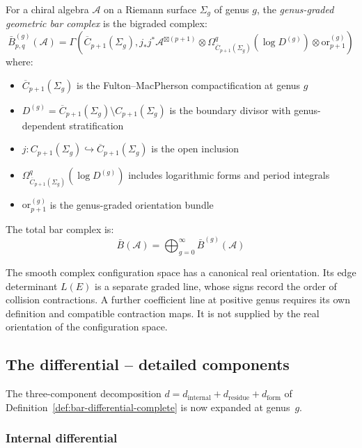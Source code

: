 \begin{definition}\label{def:geom-bar}
For a chiral algebra $\mathcal{A}$ on a Riemann surface $\Sigma_g$ of genus $g$, the \emph{genus-graded geometric bar complex} is the bigraded complex:
\[
\bar{B}^{(g)}_{p,q}(\mathcal{A}) = \Gamma\left(\overline{C}_{p+1}(\Sigma_g), j_*j^*\mathcal{A}^{\boxtimes(p+1)} \otimes \Omega^q_{\overline{C}_{p+1}(\Sigma_g)}(\log D^{(g)}) \otimes \text{or}_{p+1}^{(g)}\right)
\]
where:
\begin{itemize}
\item $\overline{C}_{p+1}(\Sigma_g)$ is the Fulton--MacPherson compactification at genus $g$
\item $D^{(g)} = \overline{C}_{p+1}(\Sigma_g) \setminus C_{p+1}(\Sigma_g)$ is the boundary divisor with genus-dependent stratification
\item $j: C_{p+1}(\Sigma_g) \hookrightarrow \overline{C}_{p+1}(\Sigma_g)$ is the open inclusion
\item $\Omega^q_{\overline{C}_{p+1}(\Sigma_g)}(\log D^{(g)})$ includes logarithmic forms and period integrals
\item $\text{or}_{p+1}^{(g)}$ is the genus-graded orientation bundle
\end{itemize}

The total bar complex is:
\[\bar{B}(\mathcal{A}) = \bigoplus_{g=0}^{\infty} \bar{B}^{(g)}(\mathcal{A})\]
\end{definition}
 
\begin{remark}
The smooth complex configuration space has a canonical real orientation.
Its edge determinant $L(E)$ is a separate graded line,
whose signs record the order of collision contractions.
A further coefficient line at positive genus requires its own definition and compatible contraction maps.
It is not supplied by the real orientation of the configuration space.
\end{remark}

\subsection{The differential -- detailed components}

The three-component decomposition $d = d_{\text{internal}} + d_{\text{residue}} + d_{\text{form}}$
of Definition~\ref{def:bar-differential-complete} is now expanded at genus~$g$.
 
\subsubsection{Internal differential}
 
